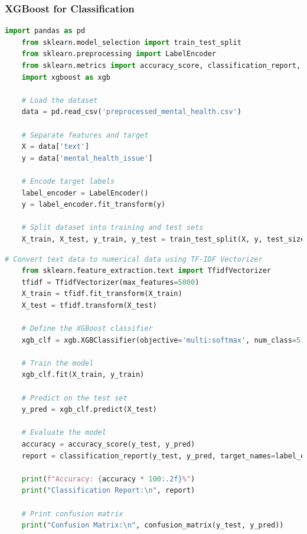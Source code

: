 \subsubsection{XGBoost for Classification}

\begin{tcolorbox}[colback=gray!5!white, colframe=gray!80!black, boxrule=0.5pt, title=XGBoost Classifier Implementation]
    \begin{lstlisting}[language=Python]
    import pandas as pd
    from sklearn.model_selection import train_test_split
    from sklearn.preprocessing import LabelEncoder
    from sklearn.metrics import accuracy_score, classification_report, confusion_matrix
    import xgboost as xgb

    # Load the dataset
    data = pd.read_csv('preprocessed_mental_health.csv')

    # Separate features and target
    X = data['text']
    y = data['mental_health_issue']

    # Encode target labels
    label_encoder = LabelEncoder()
    y = label_encoder.fit_transform(y)

    # Split dataset into training and test sets
    X_train, X_test, y_train, y_test = train_test_split(X, y, test_size=0.2, random_state=42)

\end{lstlisting}
\end{tcolorbox}

\begin{tcolorbox}[colback=gray!5!white, colframe=gray!80!black, boxrule=0.5pt, title=XGBoost Classifier Implementation]
    \begin{lstlisting}[language=Python]
    # Convert text data to numerical data using TF-IDF Vectorizer
    from sklearn.feature_extraction.text import TfidfVectorizer
    tfidf = TfidfVectorizer(max_features=5000)
    X_train = tfidf.fit_transform(X_train)
    X_test = tfidf.transform(X_test)

    # Define the XGBoost classifier
    xgb_clf = xgb.XGBClassifier(objective='multi:softmax', num_class=5, eval_metric='mlogloss', use_label_encoder=False)

    # Train the model
    xgb_clf.fit(X_train, y_train)

    # Predict on the test set
    y_pred = xgb_clf.predict(X_test)

    # Evaluate the model
    accuracy = accuracy_score(y_test, y_pred)
    report = classification_report(y_test, y_pred, target_names=label_encoder.classes_)

    print(f"Accuracy: {accuracy * 100:.2f}%")
    print("Classification Report:\n", report)

    # Print confusion matrix
    print("Confusion Matrix:\n", confusion_matrix(y_test, y_pred))
    \end{lstlisting}
\end{tcolorbox}

